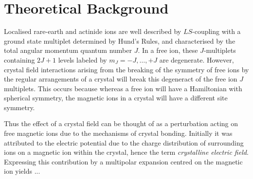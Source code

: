 \documentclass[12pt,onecolumn,tightenlines,aps,amsmath,floatfix,notitlepage,nofootinbib]{revtex4}
\begin{document}

\section{Theoretical Background} \label{sec-theory}

Localised rare-earth and actinide ions are well described by $LS$-coupling with a ground state multiplet determined by Hund's Rules, and characterised by the total angular momentum quantum number $J$. In a free ion, these $J$-multiplets containing $2J+1$ levels labeled by $m_J = -J,\ldots,+J$ are degenerate. However, crystal field interactions arising from the breaking of the symmetry of free ions by the regular arrangements of a crystal will break this degeneract of the free ion $J$ multiplets. This occurs because whereas a free ion will have a Hamiltonian with spherical symmetry, the magnetic ions in a crystal will have a different site symmetry. 

Thus the effect of a crystal field can be thought of as a perturbation acting on free magnetic ions due to the mechanisms of crystal bonding. Initially it was attributed to the electric potential due to the charge distribution of surrounding ions on a magnetic ion within the crystal, hence the term \emph{crystalline electric field}. Expressing this contribution by a multipolar expansion centred on the magnetic ion yields ...






\end{document}
